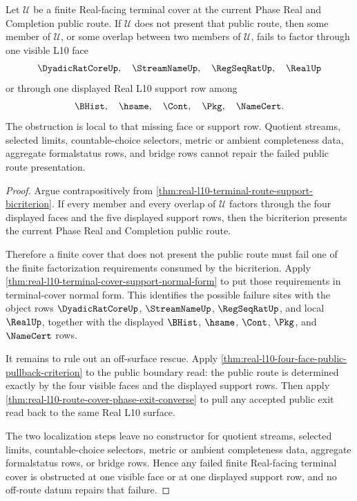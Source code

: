 \begin{theorem}
\label{thm:real-l10-terminal-route-support-obstruction}
Let $\mathcal{U}$ be a finite Real-facing terminal cover at the current Phase
Real and Completion public route. If $\mathcal{U}$ does not present that public
route, then some member of $\mathcal{U}$, or some overlap between two members
of $\mathcal{U}$, fails to factor through one visible L10 face
$$
\DyadicRatCoreUp,\quad \StreamNameUp,\quad \RegSeqRatUp,\quad \RealUp
$$
or through one displayed Real L10 support row among
$$
\BHist,\quad \hsame,\quad \Cont,\quad \Pkg,\quad \NameCert.
$$
The obstruction is local to that missing face or support row. Quotient
streams, selected limits, countable-choice selectors, metric or ambient
completeness data, aggregate formalstatus rows, and bridge rows cannot repair
the failed public route presentation.
\end{theorem}
\begin{proof}
Argue contrapositively from
\autoref{thm:real-l10-terminal-route-support-bicriterion}. If every member
and every overlap of $\mathcal{U}$ factors through the four displayed faces
and the five displayed support rows, then the bicriterion presents the current
Phase Real and Completion public route.

Therefore a finite cover that does not present the public route must fail one
of the finite factorization requirements consumed by the bicriterion. Apply
\autoref{thm:real-l10-terminal-cover-support-normal-form} to put those
requirements in terminal-cover normal form. This identifies the possible
failure sites with the object rows
$\DyadicRatCoreUp$, $\StreamNameUp$, $\RegSeqRatUp$, and local $\RealUp$,
together with the displayed $\BHist$, $\hsame$, $\Cont$, $\Pkg$, and
$\NameCert$ rows.

It remains to rule out an off-surface rescue. Apply
\autoref{thm:real-l10-four-face-public-pullback-criterion} to the public
boundary read: the public route is determined exactly by the four visible
faces and the displayed support rows. Then apply
\autoref{thm:real-l10-route-cover-phase-exit-converse} to pull any accepted
public exit read back to the same Real L10 surface.

The two localization steps leave no constructor for quotient streams,
selected limits, countable-choice selectors, metric or ambient completeness
data, aggregate formalstatus rows, or bridge rows. Hence any failed finite
Real-facing terminal cover is obstructed at one visible face or at one
displayed support row, and no off-route datum repairs that failure.
\end{proof}
